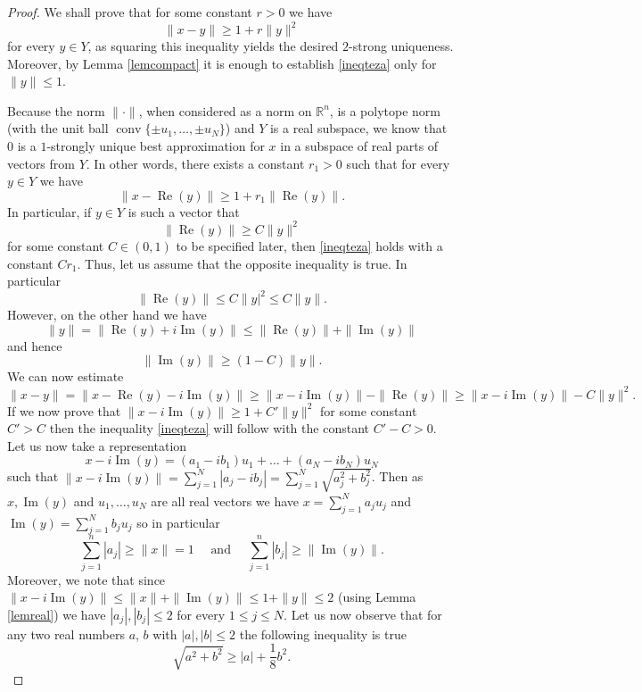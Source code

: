 \documentclass[12pt, reqno]{amsart}
\theoremstyle{definition}
\theoremstyle{remark}
\numberwithin{equation}{section}
\DeclareMathOperator{\conv}{conv}
\DeclareMathOperator{\re}{Re}
\DeclareMathOperator{\im}{Im}
\begin{document}
\begin{proof}
We shall prove that for some constant $r>0$ we have
\begin{equation}
\label{ineqteza}
\|x-y\| \geq 1 + r\|y\|^2
\end{equation}
for every $y \in Y$, as squaring this inequality yields the desired $2$-strong uniqueness. Moreover, by Lemma \ref{lemcompact} it is enough to establish \eqref{ineqteza} only for $\|y\| \leq 1$.

Because the norm $ \| \cdot \|$, when considered as a norm on $\mathbb{R}^n$, is a polytope norm (with the unit ball $\conv \{\pm u_1, \ldots, \pm u_N\}$) and $Y$ is a real subspace, we know that $0$ is a $1$-strongly unique best approximation for $x$ in a subspace of real parts of vectors from $Y$. In other words, there exists a constant $r_1>0$ such that for every $y \in Y$ we have
$$\|x-\re(y)\| \geq 1 + r_1\|\re(y)\|.$$
In particular, if $y \in Y$ is such a vector that
$$\|\re(y)\| \geq C \|y\|^2$$
for some constant $C \in (0, 1)$ to be specified later, then \eqref{ineqteza} holds with a constant $Cr_1$. Thus, let us assume that the opposite inequality is true. In particular
$$\|\re(y)\| \leq C \|y|^2 \leq C \|y\|.$$
However, on the other hand we have
$$\|y\| = \|\re(y) + i\im(y)\| \leq \|\re(y)\| + \|\im(y)\|$$
and hence
\begin{equation}
\label{ineqim}
\|\im(y)\| \geq (1-C)\|y\|.
\end{equation}
We can now estimate
$$\|x-y\| = \|x - \re(y) - i\im(y)\| \geq \|x - i \im(y)\| - \|\re(y)\| \geq \|x - i \im(y)\| - C\|y\|^2.$$
If we now prove that $\|x - i \im(y)\| \geq 1 + C'\|y\|^2$ for some constant $C'>C$ then the inequality \eqref{ineqteza} will follow with the constant $C'-C>0$. Let us now take a representation
$$x - i \im(y) = (a_1 - ib_1)u_1 + \ldots + (a_N - ib_N)u_N$$
such that $\|x - i \im(y)\| = \sum_{j=1}^{N} |a_j - ib_j| = \sum_{j=1}^{N} \sqrt{a_j^2 + b_j^2}$. Then as $x, \im(y)$ and $u_1, \ldots, u_N$ are all real vectors we have $x = \sum_{j=1}^{N} a_ju_j$ and $\im(y) = \sum_{j=1}^{N} b_ju_j$ so in particular 
\begin{equation}
\label{oszacowania}
\sum_{j=1}^{n} |a_j| \geq \|x\|=1 \quad \text{  and  } \quad \sum_{j=1}^{n} |b_j| \geq \|\im(y)\|.
\end{equation}
Moreover, we note that since $\|x-i \im(y)\| \leq \|x\| + \|\im(y)\| \leq 1 + \|y\| \leq 2$ (using Lemma \ref{lemreal}) we have $|a_j|, |b_j| \leq 2$ for every $1 \leq j \leq N$. Let us now observe that for any two real numbers $a$, $b$ with $|a|, |b| \leq 2$ the following inequality is true
$$\sqrt{a^2 + b^2} \geq |a| + \frac{1}{8}b^2.$$

\end{proof}
\end{document}
